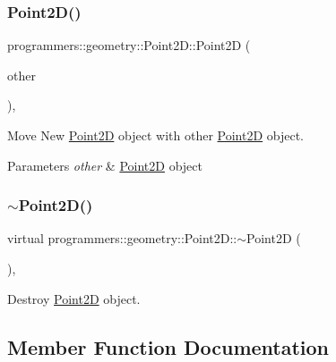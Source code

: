 \subsubsection{\texorpdfstring{Point2\+D()}{Point2D()}\hspace{0.1cm}{\footnotesize\ttfamily [4/4]}}
{\footnotesize\ttfamily programmers\+::geometry\+::\+Point2\+D\+::\+Point2D (\begin{DoxyParamCaption}\item[{\hyperlink{classprogrammers_1_1geometry_1_1Point2D}{Point2D} \&\&}]{other }\end{DoxyParamCaption})\hspace{0.3cm}{\ttfamily [default]}, {\ttfamily [noexcept]}}



Move New \hyperlink{classprogrammers_1_1geometry_1_1Point2D}{Point2D} object with other \hyperlink{classprogrammers_1_1geometry_1_1Point2D}{Point2D} object. 


\begin{DoxyParams}{Parameters}
{\em other} & \hyperlink{classprogrammers_1_1geometry_1_1Point2D}{Point2D} object \\
\hline
\end{DoxyParams}
\mbox{\label{classprogrammers_1_1geometry_1_1Point2D_a61f13d98978ddb65c4380657fb429cb3}} 
\subsubsection{\texorpdfstring{$\sim$\+Point2\+D()}{~Point2D()}}
{\footnotesize\ttfamily virtual programmers\+::geometry\+::\+Point2\+D\+::$\sim$\+Point2D (\begin{DoxyParamCaption}{ }\end{DoxyParamCaption})\hspace{0.3cm}{\ttfamily [virtual]}, {\ttfamily [default]}}



Destroy \hyperlink{classprogrammers_1_1geometry_1_1Point2D}{Point2D} object. 



\subsection{Member Function Documentation}
\mbox{\label{classprogrammers_1_1geometry_1_1Point2D_a724e8f68efe2a33069335a8401ecfc70}} 
